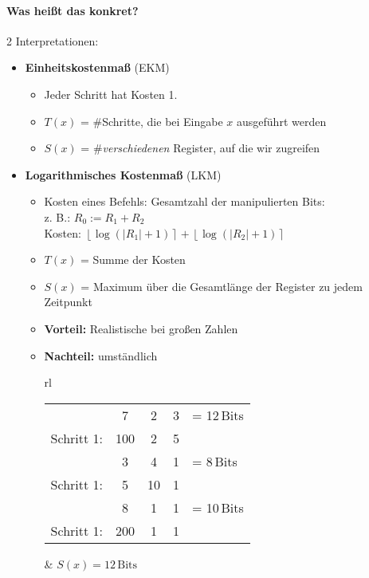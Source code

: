  \paragraph{Was heißt das konkret?} 2 Interpretationen:
	\begin{itemize}
	 \item \textbf{Einheitskostenmaß} (EKM)
		\begin{itemize}
		\item Jeder Schritt hat Kosten 1.
		\item $T(x)$ = \#Schritte, die bei Eingabe $x$ ausgeführt werden
		\item $S(x)$ = \#\emph{verschiedenen} Register, auf die wir zugreifen
		\end{itemize}
	 \item \textbf{Logarithmisches Kostenmaß} (LKM)
		\begin{itemize}
		 \item Kosten eines Befehls: Gesamtzahl der manipulierten Bits:\\
			z. B.: $R_0 := R_1 + R_2$\\
			Kosten: $\left\lfloor\log(|R_1|+1)\right\rceil + \left\lfloor\log(|R_2|+1)\right\rceil$
		 \item $T(x)$ = Summe der Kosten
		 \item $S(x)$ = Maximum über die Gesamtlänge der Register zu jedem Zeitpunkt
		 \item \textbf{Vorteil:} Realistische bei großen Zahlen
		 \item \textbf{Nachteil:} umständlich
		 \begin{center}
		 \begin{tabular}{rl}
			\begin{minipage}{6cm}
			 \begin{tabular}{rcccl}
				& \footnotesize 7 & \footnotesize 2 & \footnotesize 3 & \footnotesize= 12\,Bits \\
				Schritt 1: & 100 & 2 & 5 & \\
				& \footnotesize 3 & \footnotesize 4 & \footnotesize 1 & \footnotesize= 8\,Bits \\
				Schritt 1: & 5 & 10 & 1 & \\
				& \footnotesize 8 & \footnotesize 1 & \footnotesize 1 &\footnotesize= 10\,Bits \\
				Schritt 1: & 200 & 1 & 1 & 
			 \end{tabular}
			\end{minipage}
		  & $S(x) = 12\,\text{Bits}$
		 \end{tabular}
		 \end{center}
		\end{itemize}
	\end{itemize}
